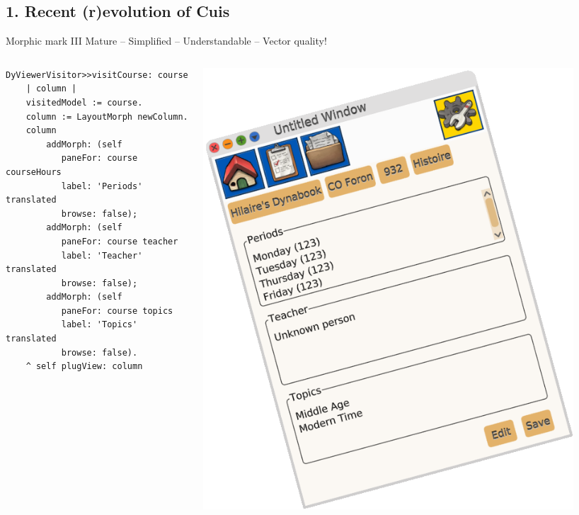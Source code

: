 \documentclass{beamer}
\begin{document}
\subsection{1. Recent (r)evolution of Cuis}
\begin{frame}[fragile]{Morphic mark III}
Mature -- Simplified -- Understandable -- Vector quality!
\begin{columns}[c]
  \begin{column}{0.5\textwidth}
    \fontsize{9pt}{8pt}\selectfont
    \begin{lstlisting}[language=Smalltalk]
DyViewerVisitor>>visitCourse: course
	| column |
	visitedModel := course.
	column := LayoutMorph newColumn.
	column
        addMorph: (self
           paneFor: course courseHours
           label: 'Periods' translated
           browse: false);
        addMorph: (self
           paneFor: course teacher
           label: 'Teacher' translated
           browse: false);
        addMorph: (self
           paneFor: course topics
           label: 'Topics' translated
           browse: false).
	^ self plugView: column
      \end{lstlisting}
    \end{column}    
    \begin{column}{0.5\textwidth}
      \includegraphics[width=0.9\textwidth]{CompiledLayout.png}
    \end{column}  
  \end{columns}
\end{frame}
\end{document}
